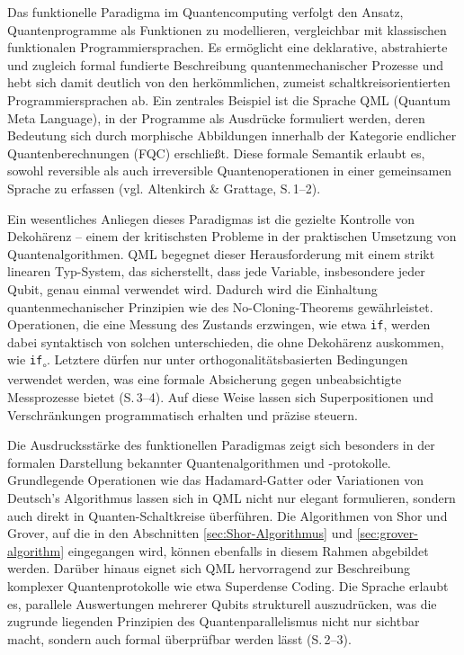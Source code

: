 Das funktionelle Paradigma im Quantencomputing verfolgt den Ansatz, Quantenprogramme als Funktionen zu modellieren, vergleichbar mit klassischen funktionalen Programmiersprachen. Es ermöglicht eine deklarative, abstrahierte und zugleich formal fundierte Beschreibung quantenmechanischer Prozesse und hebt sich damit deutlich von den herkömmlichen, zumeist schaltkreisorientierten Programmiersprachen ab. Ein zentrales Beispiel ist die Sprache QML (Quantum Meta Language), in der Programme als Ausdrücke formuliert werden, deren Bedeutung sich durch morphische Abbildungen innerhalb der Kategorie endlicher Quantenberechnungen (FQC) erschließt. Diese formale Semantik erlaubt es, sowohl reversible als auch irreversible Quantenoperationen in einer gemeinsamen Sprache zu erfassen (vgl. Altenkirch \& Grattage, S.\,1--2).

Ein wesentliches Anliegen dieses Paradigmas ist die gezielte Kontrolle von Dekohärenz -- einem der kritischsten Probleme in der praktischen Umsetzung von Quantenalgorithmen. QML begegnet dieser Herausforderung mit einem strikt linearen Typ-System, das sicherstellt, dass jede Variable, insbesondere jeder Qubit, genau einmal verwendet wird. Dadurch wird die Einhaltung quantenmechanischer Prinzipien wie des No-Cloning-Theorems gewährleistet. Operationen, die eine Messung des Zustands erzwingen, wie etwa \texttt{if}, werden dabei syntaktisch von solchen unterschieden, die ohne Dekohärenz auskommen, wie \texttt{if\textsubscript{$\circ$}}. Letztere dürfen nur unter orthogonalitätsbasierten Bedingungen verwendet werden, was eine formale Absicherung gegen unbeabsichtigte Messprozesse bietet (S.\,3--4). Auf diese Weise lassen sich Superpositionen und Verschränkungen programmatisch erhalten und präzise steuern.

Die Ausdrucksstärke des funktionellen Paradigmas zeigt sich besonders in der formalen Darstellung bekannter Quantenalgorithmen und -protokolle. Grundlegende Operationen wie das Hadamard-Gatter oder Variationen von Deutsch's Algorithmus lassen sich in QML nicht nur elegant formulieren, sondern auch direkt in Quanten-Schaltkreise überführen. Die Algorithmen von Shor und Grover, auf die in den Abschnitten \ref{sec:Shor-Algorithmus} und \ref{sec:grover-algorithm} eingegangen wird, können ebenfalls in diesem Rahmen abgebildet werden. Darüber hinaus eignet sich QML hervorragend zur Beschreibung komplexer Quantenprotokolle wie etwa Superdense Coding. Die Sprache erlaubt es, parallele Auswertungen mehrerer Qubits strukturell auszudrücken, was die zugrunde liegenden Prinzipien des Quantenparallelismus nicht nur sichtbar macht, sondern auch formal überprüfbar werden lässt (S.\,2--3).

